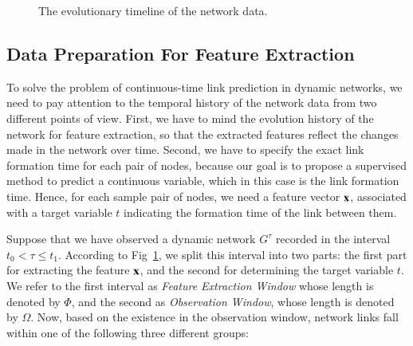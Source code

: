 \begin{figure}
	\begin{chronology}[align=left, startyear=0,stopyear=200, width=\columnwidth, height=1pt, startdate=false, stopdate=false, arrowwidth=4pt, arrowheight=3pt]
		\scriptsize
	\end{chronology}
	\caption{The evolutionary timeline of the network data.}
	\label{fig:timeline}
\end{figure}

\subsection{Data Preparation For Feature Extraction}
To solve the problem of continuous-time link prediction in dynamic networks, we need to pay attention to the temporal history of the network data from two different points of view. First, we have to mind the evolution history of the network for feature extraction, so that the extracted features reflect the changes made in the network over time. Second, we have to specify the exact link formation time for each pair of nodes, because our goal is to propose a supervised method to predict a continuous variable, which in this case is the link formation time. Hence, for each sample pair of nodes, we need a feature vector $\mathbf{x}$, associated with a target variable $t$ indicating the formation time of the link between them.

Suppose that we have observed a dynamic network $G^{\tau}$ recorded in the interval $t_0 <\tau\le t_1$. According to Fig~\ref{fig:timeline}, we split this interval into two parts: the first part for extracting the feature $\mathbf{x}$, and the second for determining the target variable $t$. We refer to the first interval as \emph{Feature Extraction Window} whose length is denoted by $\Phi$, and the second as \emph{Observation Window}, whose length is denoted by $\Omega$. Now, based on the existence in the observation window, network links fall within one of the following three different groups:

